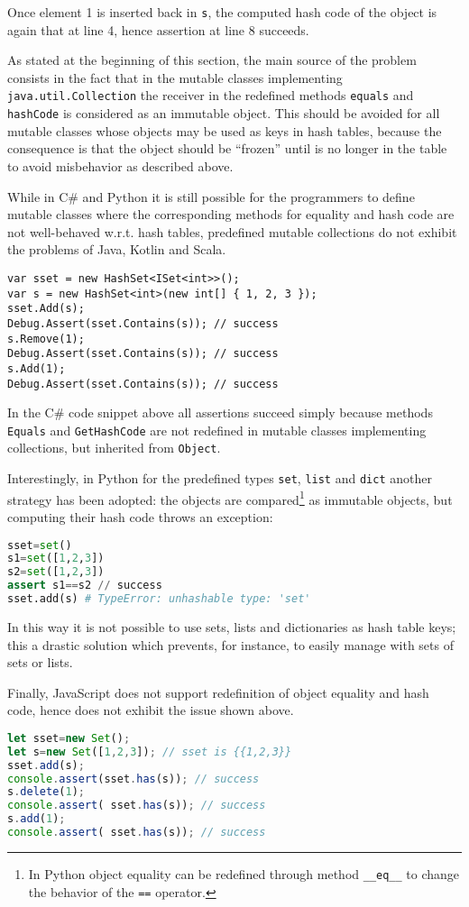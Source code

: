 Once element 1 is inserted back in \lstinline{s}, the computed hash code of the object is again that at line 4, hence assertion at line 8 succeeds. 

As stated at the beginning of this section, the main source of the problem consists in the fact that in the mutable classes implementing \lstinline{java.util.Collection} the receiver in the redefined methods \lstinline{equals} and \lstinline{hashCode} is considered as an immutable object. This should be avoided for all mutable classes whose objects may be used as keys in hash tables, because the consequence is that the object should be ``frozen'' until is no longer in the table to avoid misbehavior as described above.

While in C\# and Python it is still possible for the programmers to define mutable classes where the corresponding methods for
equality and hash code are not well-behaved w.r.t. hash tables, predefined mutable collections do not exhibit the problems of Java, Kotlin and Scala.
\begin{lstlisting}
var sset = new HashSet<ISet<int>>();
var s = new HashSet<int>(new int[] { 1, 2, 3 });
sset.Add(s);
Debug.Assert(sset.Contains(s)); // success
s.Remove(1);
Debug.Assert(sset.Contains(s)); // success 
s.Add(1);
Debug.Assert(sset.Contains(s)); // success
\end{lstlisting}
In the C\# code snippet above all assertions succeed simply because methods \lstinline{Equals} and \lstinline{GetHashCode} are not redefined
in mutable classes implementing collections, but inherited from \lstinline{Object}.

Interestingly, in Python for the predefined types \lstinline{set}, \lstinline{list} and \lstinline{dict} another strategy has been adopted: the objects are compared\footnote{In Python object equality can be redefined through method \lstinline{__eq__} to change the behavior of the \lstinline{==} operator.} as
immutable objects, but computing their hash code throws an exception:
\begin{lstlisting}[language=Python]
sset=set()                                                           
s1=set([1,2,3])
s2=set([1,2,3])
assert s1==s2 // success
sset.add(s) # TypeError: unhashable type: 'set'       
\end{lstlisting}
In this way it is not possible to use sets, lists and dictionaries as hash table keys; this a drastic solution which prevents, for instance, to easily manage with sets of sets or lists. 

Finally, JavaScript does not support redefinition of object equality and hash code, hence does not exhibit the issue shown above. 
\begin{lstlisting}[language=Javascript]
let sset=new Set();                                                           
let s=new Set([1,2,3]); // sset is {{1,2,3}}                                                         
sset.add(s);
console.assert(sset.has(s)); // success
s.delete(1);
console.assert( sset.has(s)); // success
s.add(1);
console.assert( sset.has(s)); // success
\end{lstlisting}
